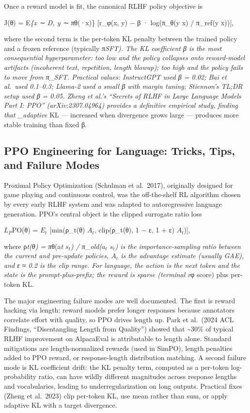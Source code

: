 \documentclass{article}
\begin{document}
Once a reward model is fit, the canonical RLHF policy objective is

J(θ) = E\emph{\{x ∼ D, y ∼ π}θ(·\textbar x)\} {[}r\_φ(x, y) − β · log(π\_θ(y \textbar{} x) / π\_ref(y \textbar{} x)){]},

where the second term is the per-token KL penalty between the trained policy and a frozen reference (typically π\emph{SFT). The KL coefficient β is the most consequential hyperparameter: too low and the policy collapses onto reward-model artifacts (incoherent text, repetition, length blowup); too high and the policy fails to move from π\_SFT. Practical values: InstructGPT used β = 0.02; Bai et al.~used 0.1--0.3; Llama-2 used a small β with margin tuning; Stiennon's TL;DR setup used β = 0.05. Zheng et al.'s ``Secrets of RLHF in Large Language Models Part I: PPO'' (arXiv:2307.04964) provides a definitive empirical study, finding that \_adaptive} KL --- increased when divergence grows large --- produces more stable training than fixed β.

\subsection{PPO Engineering for Language: Tricks, Tips, and Failure Modes}\label{ppo-engineering-for-language-tricks-tips-and-failure-modes}

Proximal Policy Optimization (Schulman et al.~2017), originally designed for game playing and continuous control, was the off-the-shelf RL algorithm chosen by every early RLHF system and was adapted to autoregressive language generation. PPO's central object is the clipped surrogate ratio loss

\(L_P\)PO(θ) = \(E_t\) {[}min(ρ\_t(θ) \(A_t\), clip(ρ\_t(θ), 1 − ε, 1 + ε) \(A_t\)){]},

where ρ\emph{t(θ) = π}θ(a\emph{t \textbar{} \(s_t\)) / π\_old(\(a_t\) \textbar{} \(s_t\)) is the importance-sampling ratio between the current and pre-update policies, \(A_t\) is the advantage estimate (usually GAE), and ε ≈ 0.2 is the clip range. For language, the action is the next token and the state is the prompt-plus-prefix; the reward is sparse (terminal r}φ score) plus per-token KL.

The major engineering failure modes are well documented. The first is reward hacking via length: reward models prefer longer responses because annotators correlate effort with quality, so PPO drives length up. Park et al.~(2024 ACL Findings, ``Disentangling Length from Quality'') showed that \textasciitilde30\% of typical RLHF improvement on AlpacaEval is attributable to length alone. Standard mitigations are length-normalized rewards (used in SimPO), length penalties added to PPO reward, or response-length distribution matching. A second failure mode is KL coefficient drift: the KL penalty term, computed as a per-token log-probability ratio, can have wildly different magnitudes across response lengths and vocabularies, leading to underregularization on long outputs. Practical fixes (Zheng et al.~2023) clip per-token KL, use mean rather than sum, or apply adaptive KL with a target divergence.
\end{document}
